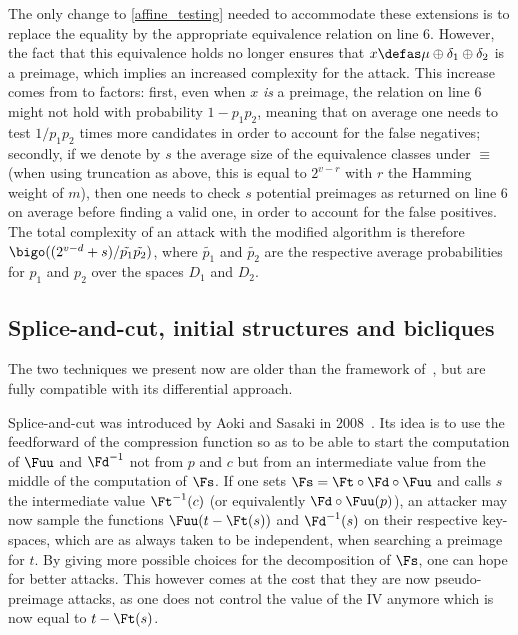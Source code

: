 The only change to \autoref{affine_testing} needed to accommodate these extensions is to replace the equality by the appropriate equivalence
relation on line 6. However, the fact that this equivalence holds no longer ensures that $x \defas \mu \oplus \delta_1 \oplus \delta_2$ is a preimage,
which implies an increased complexity for the attack.
This increase comes from to factors:  first, even when $x$ \emph{is} a preimage, the relation on line 6 might not
hold with probability $1 - p_1p_2$, meaning that on average one needs to test $1/p_1p_2$ times more candidates in order to account for
the false negatives; secondly, if we denote by $s$ the average size of the equivalence classes under $\equiv$ (when using truncation as
above, this is equal to $2^{v - r}$ with $r$ the Hamming weight of $m$), then one needs to check $s$ potential preimages
as returned on line 6 on average before finding a valid one, in order to account for the false positives.
The total complexity of an attack with the modified algorithm is therefore $\bigo((2^{v-d} + s)/\tilde{p_1}\tilde{p_2})$, where $\tilde{p_1}$ and $\tilde{p_2}$ are the respective
average probabilities for $p_1$ and $p_2$ over the spaces $D_1$ and $D_2$.

\subsection{Splice-and-cut, initial structures and bicliques}

The two techniques we present now are older than the framework of~\cite{DBLP:conf/crypto/KnellwolfK12}, but are fully compatible with its differential approach.

Splice-and-cut was introduced by Aoki and Sasaki in 2008~\cite{AS08}. Its idea is to use the feedforward of the compression
function so as to
be able to start the computation of $\Fuu$ and $\Fd^{-1}$ not from $p$ and $c$ but from an intermediate value from the middle of the computation
of $\Fs$. If one sets $\Fs = \Ft \circ \Fd \circ \Fuu$ and calls $s$ the intermediate value $\Ft^{-1}(c)$ (or equivalently $\Fd \circ \Fuu(p)$),
an attacker may now sample the functions $\Fuu(t - \Ft(s))$ and $\Fd^{-1}(s)$ on their respective key-spaces, which are as always taken to
be independent, when searching
a preimage for $t$.
By giving more possible choices for the decomposition of $\Fs$, one can hope for better attacks. This however comes at the cost that they are now
pseudo-preimage attacks, as one does not control the value of the IV anymore which is now equal to $t - \Ft(s)$.

